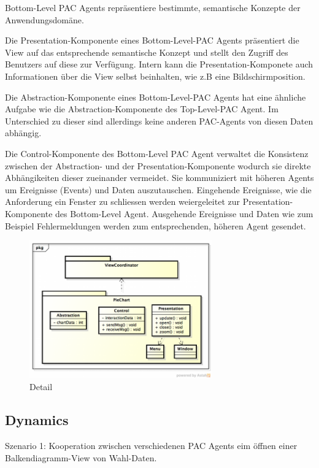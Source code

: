 Bottom-Level PAC Agents repräsentiere bestimmte, semantische Konzepte der Anwendungsdomäne.

Die Presentation-Komponente eines Bottom-Level-PAC Agents präsentiert die View auf das entsprechende semantische Konzept und stellt den Zugriff des Benutzers auf diese zur Verfügung. Intern kann die Presentation-Komponete auch Informationen über die View selbst beinhalten, wie z.B eine Bildschirmposition.

Die Abstraction-Komponente eines Bottom-Level-PAC Agents hat eine ähnliche Aufgabe wie die Abstraction-Komponente des Top-Level-PAC Agent. Im Unterschied zu dieser sind allerdings keine anderen PAC-Agents von diesen Daten abhängig.

Die Control-Komponente des Bottom-Level PAC Agent verwaltet die Konsistenz zwischen der Abstraction- und der Presentation-Komponente wodurch sie direkte Abhängikeiten dieser zueinander vermeidet. Sie kommuniziert mit höheren Agents um Ereignisse (Events) und Daten auszutauschen. Eingehende Ereignisse, wie die Anforderung ein Fenster zu schliessen werden weiergeleitet zur Presentation-Komponente des Bottom-Level Agent. Ausgehende Ereignisse und Daten wie zum Beispiel Fehlermeldungen werden zum entsprechenden, höheren Agent gesendet.

\begin{figure}[H]
	\centering
	\includegraphics[width=0.7\textwidth]{content/posa1/images/presentation-abstraction-control-details.png}
	\caption{Detail}
\end{figure}


\subsection*{Dynamics}


Szenario 1: Kooperation zwischen verschiedenen PAC Agents eim öffnen einer Balkendiagramm-View von Wahl-Daten.

